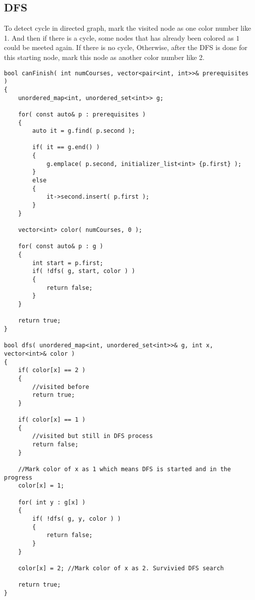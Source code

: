 \subsection{DFS}
To detect cycle in directed graph, mark the visited node as one color number like 1. And then if there is a cycle, some nodes that has already been colored as $1$ could be meeted again. If there is no cycle, Otherwise, after the DFS is done for this starting node, mark this node as another color number like 2.
\setcounter{lstlisting}{0}
\begin{lstlisting}[style=customc]
bool canFinish( int numCourses, vector<pair<int, int>>& prerequisites )
{
    unordered_map<int, unordered_set<int>> g;

    for( const auto& p : prerequisites )
    {
        auto it = g.find( p.second );

        if( it == g.end() )
        {
            g.emplace( p.second, initializer_list<int> {p.first} );
        }
        else
        {
            it->second.insert( p.first );
        }
    }

    vector<int> color( numCourses, 0 );

    for( const auto& p : g )
    {
        int start = p.first;
        if( !dfs( g, start, color ) )
        {
            return false;
        }
    }

    return true;
}

bool dfs( unordered_map<int, unordered_set<int>>& g, int x, vector<int>& color )
{
    if( color[x] == 2 )
    {
        //visited before
        return true;
    }

    if( color[x] == 1 )
    {
        //visited but still in DFS process
        return false;
    }

    //Mark color of x as 1 which means DFS is started and in the progress
    color[x] = 1;

    for( int y : g[x] )
    {
        if( !dfs( g, y, color ) )
        {
            return false;
        }
    }

    color[x] = 2; //Mark color of x as 2. Survivied DFS search

    return true;
}
\end{lstlisting}
